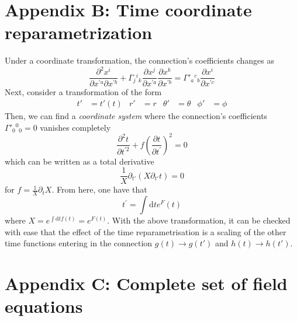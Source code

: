 \documentclass[10pt,a4paper]{article}
\begin{document}
\section{Appendix B: Time coordinate reparametrization}

Under a coordinate transformation, the connection's coefficients changes as
\begin{equation}
  \frac{\partial^2 x^i}{\partial x^{'a}\partial x^{'b}} + \Gamma_{j}{}^{i}{}_{k}\frac{\partial x^j}{\partial x^{'a}}\frac{\partial x^k}{\partial x^{'b}} 
  = \Gamma'_{a}{}^{c}{}_{b}\frac{\partial x^i}{\partial x^{'c}}
\end{equation}
Next, consider a transformation of the form
\begin{align}
  t' & = t'(t) & r' & = r & \theta ' & = \theta & \phi' & = \phi
\end{align}
Then, we can find a \textit{coordinate system} where the connection's coefficients $\Gamma'_{0}{}^{0}{}_{0} = 0$ vanishes completely
\begin{equation}
  \frac{\partial^2 t}{\partial t^{'2}} + f \left(\frac{\partial t}{\partial t^{'}}\right)^2 = 0
\end{equation}
which can be written as a total derivative
\begin{equation}
  \frac{1}{X}\partial_{t'}\left(X \partial_{t'}t\right) = 0
\end{equation}
for $f = \frac{1}{X}\partial_t X$. From here, one have that
\begin{equation}
  t^{'} = \int \mathrm{d}t e^F(t)
\end{equation}
where $X = e^{\int \mathrm{d}t f(t)} = e^{F(t)}$. With the above transformation, it can be checked with ease that the effect of the time
reparametrisation is a scaling of the other time functions entering in the connection $g(t) \to g(t')$ and $h(t) \to h(t')$.

\section{Appendix C: Complete set of field equations}
\end{document}
